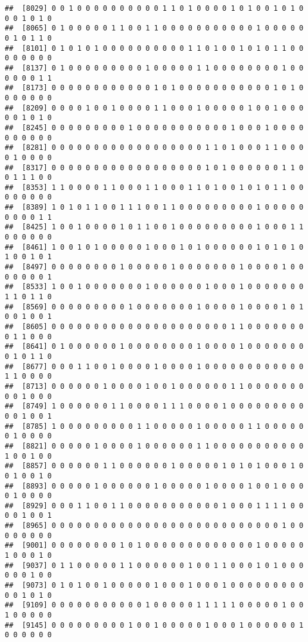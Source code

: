 \documentclass[
]{article}
\begin{document}
\begin{verbatim}
##  [8029] 0 0 1 0 0 0 0 0 0 0 0 0 0 1 1 0 1 0 0 0 0 1 0 1 0 0 1 0 1 0 0 0 1 0 1 0
##  [8065] 0 1 0 0 0 0 0 1 1 0 0 1 1 0 0 0 0 0 0 0 0 0 0 0 1 0 0 0 0 0 0 1 0 1 1 0
##  [8101] 0 1 0 1 0 1 0 0 0 0 0 0 0 0 0 0 1 1 0 1 0 0 1 0 1 0 1 1 0 0 0 0 0 0 0 0
##  [8137] 0 1 0 0 0 0 0 0 0 0 0 1 0 0 0 0 0 1 1 0 0 0 0 0 0 0 0 1 0 0 0 0 0 0 1 1
##  [8173] 0 0 0 0 0 0 0 0 0 0 0 0 1 0 1 0 0 0 0 0 0 0 0 0 0 0 1 0 1 0 0 0 0 0 0 0
##  [8209] 0 0 0 0 1 0 0 1 0 0 0 0 1 1 0 0 0 1 0 0 0 0 0 1 0 0 1 0 0 0 0 0 1 0 1 0
##  [8245] 0 0 0 0 0 0 0 0 0 1 0 0 0 0 0 0 0 0 0 0 0 1 0 0 0 1 0 0 0 0 0 0 0 0 0 0
##  [8281] 0 0 0 0 0 0 0 0 0 0 0 0 0 0 0 0 0 0 1 1 0 1 0 0 0 1 1 0 0 0 0 1 0 0 0 0
##  [8317] 0 0 0 0 0 0 0 0 0 0 0 0 0 0 0 0 0 0 1 0 1 0 0 0 0 0 0 1 1 0 0 1 1 1 0 0
##  [8353] 1 1 0 0 0 0 1 1 0 0 0 1 1 0 0 0 1 1 0 1 0 0 1 0 1 0 1 1 0 0 0 0 0 0 0 0
##  [8389] 1 0 1 0 1 1 0 0 1 1 1 0 0 1 1 0 0 0 0 0 0 0 0 0 1 0 0 0 0 0 0 0 0 0 1 1
##  [8425] 1 0 0 1 0 0 0 0 1 0 1 1 0 0 1 0 0 0 0 0 0 0 0 0 1 0 0 0 1 1 0 0 0 0 0 0
##  [8461] 1 0 0 1 0 1 0 0 0 0 0 1 0 0 0 1 0 1 0 0 0 0 0 0 1 0 1 0 1 0 1 0 0 1 0 1
##  [8497] 0 0 0 0 0 0 0 0 1 0 0 0 0 0 1 0 0 0 0 0 0 0 1 0 0 0 0 1 0 0 0 0 0 0 0 1
##  [8533] 1 0 0 1 0 0 0 0 0 0 0 1 0 0 0 0 0 0 1 0 0 0 1 0 0 0 0 0 0 0 1 1 0 1 1 0
##  [8569] 0 0 0 0 0 0 0 0 0 1 0 0 0 0 0 0 0 1 0 0 0 0 1 0 0 0 0 1 0 1 0 0 1 0 0 1
##  [8605] 0 0 0 0 0 0 0 0 0 0 0 0 0 0 0 0 0 0 0 0 0 1 1 0 0 0 0 0 0 0 0 1 1 0 0 0
##  [8641] 0 1 0 0 0 0 0 0 1 0 0 0 0 0 0 0 0 1 0 0 0 0 1 0 0 0 0 0 0 0 0 1 0 1 1 0
##  [8677] 0 0 0 1 1 0 0 1 0 0 0 0 1 0 0 0 0 1 0 0 0 0 0 0 0 0 0 0 0 0 1 1 0 0 0 0
##  [8713] 0 0 0 0 0 0 1 0 0 0 0 1 0 0 1 0 0 0 0 0 0 1 1 0 0 0 0 0 0 0 0 0 1 0 0 0
##  [8749] 1 0 0 0 0 0 0 1 1 0 0 0 0 1 1 1 0 0 0 0 1 0 0 0 0 0 0 0 0 0 0 0 1 0 0 1
##  [8785] 1 0 0 0 0 0 0 0 0 0 1 1 0 0 0 0 0 1 0 0 0 0 0 1 1 0 0 0 0 0 0 1 0 0 0 0
##  [8821] 0 0 0 0 0 1 0 0 0 0 1 0 0 0 0 0 0 1 1 0 0 0 0 0 0 0 0 0 0 0 1 0 0 1 0 0
##  [8857] 0 0 0 0 0 0 1 1 0 0 0 0 0 0 1 0 0 0 0 0 1 0 1 0 1 0 0 0 1 0 0 1 0 0 1 0
##  [8893] 0 0 0 0 0 1 0 0 0 0 0 0 1 0 0 0 0 0 1 0 0 0 0 1 0 0 1 0 0 0 0 1 0 0 0 0
##  [8929] 0 0 0 1 1 0 0 1 1 0 0 0 0 0 0 0 0 0 0 0 1 0 0 0 1 1 1 1 0 0 0 0 1 0 0 1
##  [8965] 0 0 0 0 0 0 0 0 0 0 0 0 0 0 0 0 0 0 0 0 0 0 0 0 0 0 0 1 0 0 0 0 0 0 0 0
##  [9001] 0 0 0 0 0 0 0 0 1 0 1 0 0 0 0 0 0 0 0 0 0 0 0 0 1 0 0 0 0 0 1 0 0 0 1 0
##  [9037] 0 1 1 0 0 0 0 0 1 1 0 0 0 0 0 0 1 0 0 1 1 0 0 0 1 0 1 0 0 0 0 0 0 1 0 0
##  [9073] 0 1 0 1 0 0 1 0 0 0 0 0 1 0 0 0 1 0 0 0 1 0 0 0 0 0 0 0 0 0 0 0 1 0 1 0
##  [9109] 0 0 0 0 0 0 0 0 0 0 0 1 0 0 0 0 0 1 1 1 1 1 0 0 0 0 0 1 0 0 1 0 0 0 0 0
##  [9145] 0 0 0 0 0 0 0 0 0 1 0 0 1 0 0 0 0 0 1 0 0 0 1 0 0 0 0 0 0 1 0 0 0 0 0 0

\end{verbatim}
\end{document}
